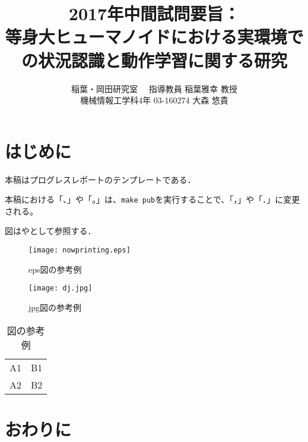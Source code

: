 \documentclass[twocolumn]{preport}
\title{2017年中間試問要旨：\\
等身大ヒューマノイドにおける実環境での状況認識と動作学習に関する研究}
\author{稲葉・岡田研究室 　指導教員 稲葉雅幸 教授\\
  機械情報工学科4年 03-160274 大森 悠貴 }
\begin{document}
\pagestyle{empty}
\maketitle
\thispagestyle{empty}
\sloppy

\section{はじめに}

本稿はプログレスレポートのテンプレートである\cite{Sakai}．

本稿における「、」や「。」は、\verb|make pub|を実行することで、「，」や「．」に変更される。

図はやとして参照する．

\begin{figure}[tbh]
 \begin{center}
  \begin{minipage}{0.3\columnwidth}
   \texttt{[image: nowprinting.eps]}
   \caption{eps図の参考例}
  \end{minipage}
  \hspace{0.15\columnwidth}
  \begin{minipage}{0.3\columnwidth}
   \texttt{[image: dj.jpg]}
   \caption{jpg図の参考例}
  \end{minipage}
  \label{figure:nowprinting}
 \end{center}
\end{figure}

\begin{table}[tbh]
 \begin{center}
  \begin{tabular}{|l|r|} \hline
  A1 & B1 \\
  A2 & B2 \\ \hline
  \end{tabular}
  \caption{図の参考例}
  \label{table:sample}
 \end{center}
\end{table}

\section{おわりに}



\end{document}
